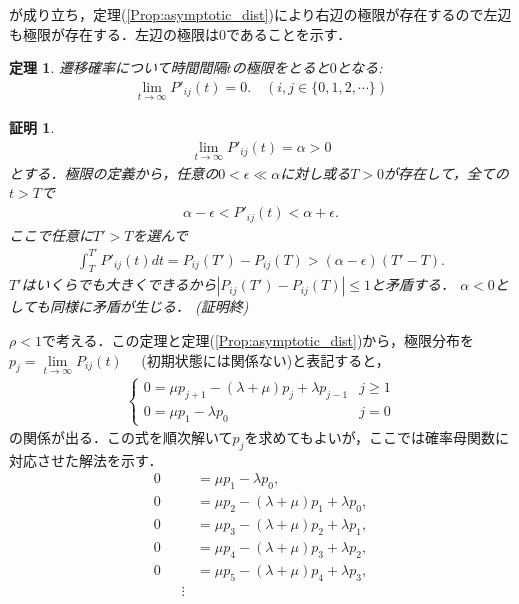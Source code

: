\documentclass[a4j,papersize,disablejfam,slide,14pt]{jsarticle}
\newtheorem{Prop}{定理}
\newtheorem{Proof}{証明}
\def\qed{{(証明終)}} %
\begin{document}
    が成り立ち，定理(\ref{Prop:asymptotic_dist})により右辺の極限が存在するので左辺も極限が存在する．左辺の極限は$0$であることを示す．
    \begin{screen}
    	\begin{Prop}
        	遷移確率について時間間隔$t$の極限をとると$0$となる:
        	\begin{align}
        		\lim_{t \to \infty} P'_{ij}(t) = 0. \quad (i,j \in \{ 0,1,2,\cdots \})
            \end{align}
        \end{Prop}
    \end{screen}
    \begin{Proof}
    	\begin{align}
        	\lim_{t \to \infty} P'_{ij}(t) = \alpha > 0
        \end{align}
        とする．極限の定義から，任意の$0 < \epsilon \ll \alpha$に対し或る$T>0$が存在して，全ての$t > T$で
        \begin{align}
        	\alpha - \epsilon < P'_{ij}(t) < \alpha + \epsilon.
        \end{align}
        ここで任意に$T' > T$を選んで
        \begin{align}
        	\int_{T}^{T'} P'_{ij}(t) dt = P_{ij}(T') - P_{ij}(T) > (\alpha - \epsilon)(T' - T).
        \end{align}
        $T'$はいくらでも大きくできるから$| P_{ij}(T') - P_{ij}(T) | \leq 1$と矛盾する．
        $\alpha < 0$としても同様に矛盾が生じる．
        \qed
    \end{Proof}
    $\rho < 1$で考える．この定理と定理(\ref{Prop:asymptotic_dist})から，極限分布を$p_j = \lim\limits_{t \to \infty} P_{ij}(t)\quad$
    (初期状態には関係ない)と表記すると，
    \begin{align}
    	\begin{cases}
        	0 = \mu p_{j+1} - (\lambda + \mu) p_j + \lambda p_{j-1} & \text{$j \geq 1$} \\
            0 = \mu p_1 - \lambda p_0 & \text{$j = 0$}
        \end{cases}
    \end{align}
    の関係が出る．この式を順次解いて$p_j$を求めてもよいが，ここでは確率母関数に対応させた解法を示す．
    \begin{align}
    	0 &= \mu p_1 - \lambda p_0, \\
        0 &= \mu p_2 - (\lambda + \mu) p_1 + \lambda p_0, \\
        0 &= \mu p_3 - (\lambda + \mu) p_2 + \lambda p_1, \\
        0 &= \mu p_4 - (\lambda + \mu) p_3 + \lambda p_2, \\
        0 &= \mu p_5 - (\lambda + \mu) p_4 + \lambda p_3, \\
        \qquad \vdots
    \end{align}
\end{document}
